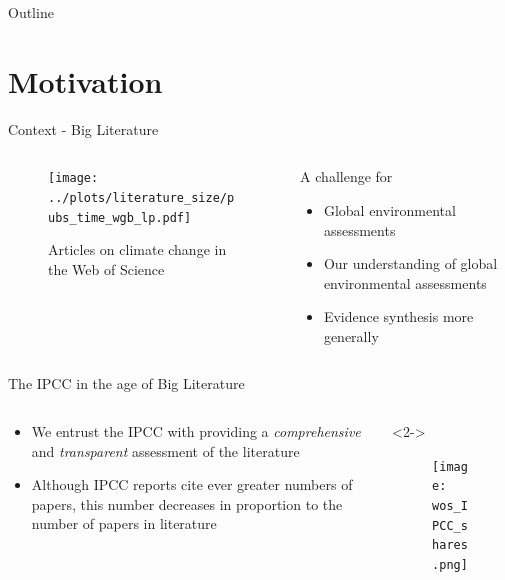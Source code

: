 \documentclass[9pt, aspectratio=169]{beamer}
\begin{document}
\begin{frame}{Outline}
\tableofcontents
\end{frame}

\section{Motivation}
\frame{\tableofcontents[currentsection]}

\begin{frame}{Context - Big Literature}
\begin{columns}
	\begin{column}{0.618\linewidth} %
		\begin{figure}
			\texttt{[image: ../plots/literature\_size/pubs\_time\_wgb\_lp.pdf]}
			\caption{Articles on climate change in the Web of Science}
		\end{figure}
	\end{column}
	\begin{column}{0.382\linewidth}
		A challenge for
		\begin{itemize}
			\item Global environmental assessments
			\item Our understanding of global environmental assessments
			\item Evidence synthesis more generally
		\end{itemize}
	\end{column}
\end{columns}
\end{frame}

\begin{frame}{The IPCC in the age of Big Literature}

\begin{columns}
	\begin{column}{0.382\linewidth}
		\begin{itemize}
			\item<1->We entrust the IPCC with providing a \textit{comprehensive} and \textit{transparent} assessment of the literature 
			\item<2->Although IPCC reports cite ever greater numbers of papers, this number decreases in proportion to the number of papers in literature
			
		\end{itemize}
	\end{column}
	\begin{column}{0.618\linewidth}<2->
		\begin{figure}
			\texttt{[image: wos\_IPCC\_shares.png]}
			\caption{\citep{Minx2017l}}
		\end{figure}
	\end{column}
\end{columns}

\end{frame}
\end{document}
